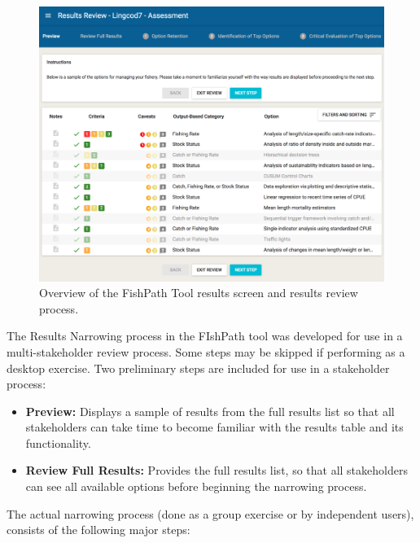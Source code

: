 \documentclass[11pt,]{book}
\providecommand{\tightlist}{%
  \setlength{\itemsep}{0pt}\setlength{\parskip}{0pt}}
\begin{document}
\begin{figure}

{\centering \includegraphics[width=0.95\linewidth]{images/results-review} 

}

\caption{Overview of the FishPath Tool results screen and results review process.}\label{fig:results-review}
\end{figure}

The Results Narrowing process in the FIshPath tool was developed for use
in a multi-stakeholder review process. Some steps may be skipped if
performing as a desktop exercise. Two preliminary steps are included for
use in a stakeholder process:

\begin{itemize}
\tightlist
\item
  \textbf{Preview:} Displays a sample of results from the full results
  list so that all stakeholders can take time to become familiar with
  the results table and its functionality.
\item
  \textbf{Review Full Results:} Provides the full results list, so that
  all stakeholders can see all available options before beginning the
  narrowing process.
\end{itemize}

The actual narrowing process (done as a group exercise or by independent
users), consists of the following major steps:
\end{document}
